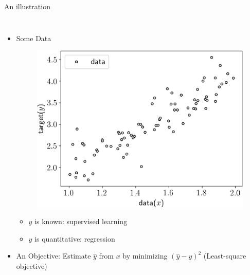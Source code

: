 \documentclass[handout]{beamer}
\begin{document}
\begin{frame}{An illustration}
\begin{columns}
\begin{itemize}
    \item Some \alert{Data}
    \begin{figure}
    \includegraphics[width=.8\textwidth]{fig/L1/data-lin.png}
    \end{figure}

    \begin{itemize}
    \item $y$ is known: supervised learning
    \item $y$ is quantitative: regression
    \end{itemize}
\pause
\item An \alert{Objective}: Estimate $\hat{y}$ from $x$ by minimizing $(\hat{y}-{y})^2$ (Least-square objective)


\end{itemize}
\end{columns}
\end{frame}
\end{document}
